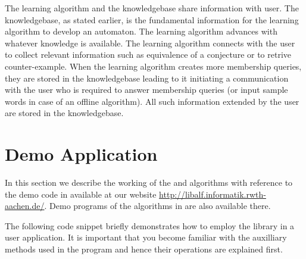 	The learning algorithm and the knowledgebase share information with user. The knowledgebase, as stated earlier, is the fundamental information for the learning algorithm to develop an automaton. The learning algorithm advances with whatever knowledge is available. The learning algorithm connects with the user to collect relevant information such as equivalence of a conjecture or to retrive counter-example. When the learning algorithm creates more membership queries, they are stored in the knowledgebase leading to it initiating a communication with the user who is required to answer membership queries (or input sample words in case of an offline algorithm). All such information extended by the user are stored in the knowledgebase. 

\section{Demo Application}

In this section we describe the working of the \offline and \online algorithms with reference to the demo code in \cpp available at our website \url{http://libalf.informatik.rwth-aachen.de/}. Demo programs of the algorithms in \java are also available there.

The following code snippet briefly demonstrates how to employ the \libalf library in a user application. It is important that you become familiar with the auxilliary methods used in the program and hence their operations are explained first.

